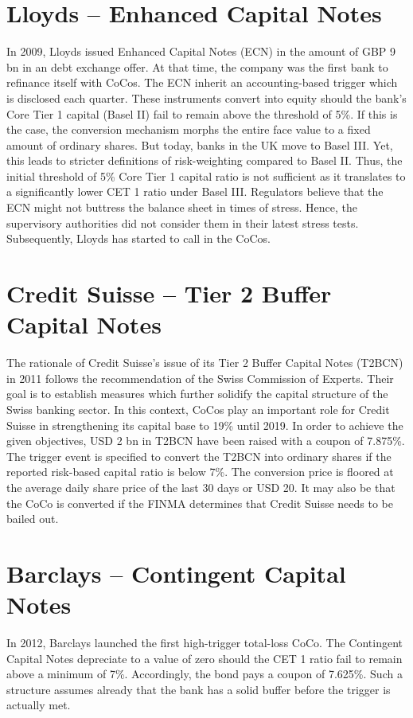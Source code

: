 \section{Lloyds -- Enhanced Capital Notes}
In 2009, Lloyds issued Enhanced Capital Notes (ECN)  in the amount of GBP 9 bn in an debt exchange offer. At that time, the company was the first bank to refinance itself with CoCos. The ECN inherit an accounting-based trigger which is disclosed each quarter. These instruments convert into equity should the bank's Core Tier 1 capital (Basel II) fail to remain above the threshold of 5\%. If this is the case, the conversion mechanism morphs the entire face value to a fixed amount of ordinary shares. But today, banks in the UK move to Basel III. Yet, this leads to stricter definitions of risk-weighting compared to Basel II. Thus, the initial threshold of 5\% Core Tier 1 capital ratio is not sufficient as it translates to a significantly lower CET 1 ratio under Basel III. Regulators believe that the ECN might not buttress the balance sheet in times of stress. Hence, the supervisory authorities did not consider them in their latest stress tests. Subsequently, Lloyds has started to call in the CoCos. \citep{lloyds2009}

\section{Credit Suisse -- Tier 2 Buffer Capital Notes}
The rationale of Credit Suisse's issue of its Tier 2 Buffer Capital Notes (T2BCN) in 2011 follows the recommendation of the Swiss Commission of Experts. Their goal is to establish measures which further solidify the capital structure of the Swiss banking sector. In this context, CoCos play an important role for Credit Suisse in strengthening its capital base to 19\% until 2019.  In order to achieve the given objectives, USD 2 bn in T2BCN have been raised with a coupon of 7.875\%. The trigger event is specified to convert the T2BCN into ordinary shares if the reported risk-based capital ratio is below 7\%. The conversion price is floored at the average daily share price of the last 30 days or USD 20. It may also be that the CoCo is converted if the FINMA determines that Credit Suisse needs to be bailed out. \citep{creditsuisse2011}


\section{Barclays -- Contingent Capital Notes}
In 2012, Barclays launched the first high-trigger total-loss CoCo. The Contingent Capital Notes depreciate to a value of zero should the CET 1 ratio fail to remain above a minimum of 7\%. Accordingly, the bond pays a coupon of 7.625\%. Such a structure assumes already that the bank has a solid buffer before the trigger is actually met. \citep{barclays2010}

